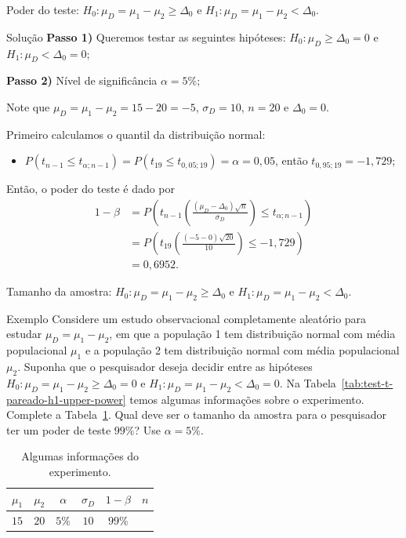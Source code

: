 \documentclass[9pt]{beamer}
\begin{document}
\begin{frame}{Poder do teste: $H_0:\mu_D = \mu_1 - \mu_2 \geq \Delta_0$ e $H_1:\mu_D =  \mu_1 - \mu_2 < \Delta_0$.}

\begin{block}{Solução}
	\textbf{Passo 1)} Queremos testar as seguintes hipóteses: $H_0: \mu_D \geq \Delta_0 = 0$ e $H_1: \mu_D < \Delta_0 = 0$;
	
	\textbf{Passo 2)} Nível de significância $\alpha=5\%$;
	
	Note que $\mu_D = \mu_1 - \mu_2 = 15 - 20 = -5$, $\sigma_D = 10$, $n=20$ e $\Delta_0=0$.
	
	Primeiro calculamos o quantil da distribuição normal:
	\begin{itemize}
		\item $P(t_{n-1} \leq t_{\alpha;n-1}) = P(t_{19} \leq t_{0,05;19}) = \alpha = 0,05$, então $t_{0,95;19} = -1,729$;
	\end{itemize}	

	Então, o poder do teste é dado por
	\begin{align*}
	1-\beta &=  P\left( t_{n-1}\left( \frac{(\mu_D - \Delta_0)\sqrt{n}}{\sigma_D} \right) \leq t_{\alpha;n-1} \right)\\
	&= P\left( t_{19}\left( \frac{(-5 - 0)\sqrt{20}}{10} \right) \leq -1,729 \right)\\
	&=0,6952.
	\end{align*}
\end{block}

\end{frame}

\begin{frame}{Tamanho da amostra: $H_0:\mu_D = \mu_1 - \mu_2 \geq \Delta_0$ e $H_1:\mu_D =  \mu_1 - \mu_2 < \Delta_0$.}

\begin{block}{Exemplo}
	Considere um estudo observacional completamente aleatório para estudar $\mu_D = \mu_1 - \mu_2$, em que a população 1 tem distribuição normal com média populacional $\mu_1$ e a população 2 tem distribuição normal com média populacional $\mu_2$. Suponha que o pesquisador deseja decidir entre as hipóteses $H_0:\mu_D = \mu_1 - \mu_2 \geq \Delta_0=0$ e $H_1: \mu_D = \mu_1 - \mu_2 < \Delta_0=0$. Na Tabela~\ref{tab:test-t-pareado-h1-upper-power} temos algumas informações sobre o experimento. Complete a Tabela~\ref{tab:test-t-pareado-h1-upper-sample-size}. Qual deve ser o tamanho da amostra para o pesquisador ter um poder de teste $99\%$? Use $\alpha = 5\%$.
	
	\begin{table}[htbp]
		\centering
		\begin{tabular}{c|c|c|c|c|c}
			\toprule[0.05cm]
			$\mu_1$ & $\mu_2$ & $\alpha$ & 			$\sigma_D$ & $1-\beta$ & $n$ \\ \midrule[0.025cm]
			$15$ & $20$ & $5\%$ & $10$ & $99\%$ &   \\ \bottomrule[0.05cm]
		\end{tabular}
		\caption{Algumas informações do experimento.}
		\label{tab:test-t-pareado-h1-upper-sample-size}
	\end{table}
\end{block}

\end{frame}
\end{document}
